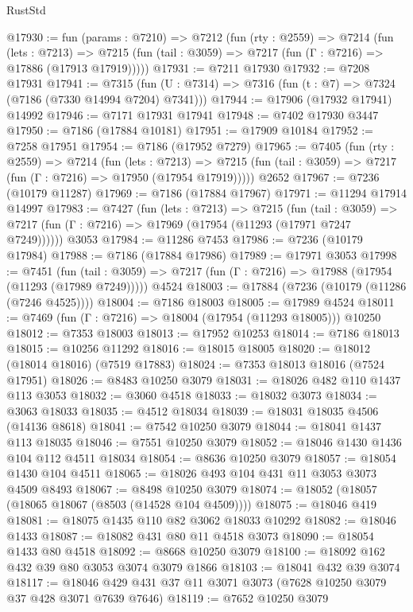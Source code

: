 \begin{lexlean}{RustStd}
\begin{coremodule}
{\begin{coremodule}
{{{{{{{{{{{{{{{{{{{{{{{{{{{{{{{{@17930 := fun (params : @7210) =>
  @7212
    (fun (rty : @2559) =>
    @7214
      (fun (lets : @7213) =>
      @7215 (fun (tail : @3059) => @7217 (fun (Γ : @7216) => @17886 (@17913 @17919)))))
@17931 := @7211 @17930
@17932 := @7208 @17931
@17941 := @7315
    (fun (U : @7314) => @7316 (fun (t : @7) => @7324 (@7186 (@7330 @14994 @7204) @7341)))
@17944 := @17906 (@17932 @17941) @14992
@17946 := @7171 @17931 @17941
@17948 := @7402 @17930 @3447
@17950 := @7186 (@17884 @10181)
@17951 := @17909 @10184
@17952 := @7258 @17951
@17954 := @7186 (@17952 @7279)
@17965 := @7405
    (fun (rty : @2559) =>
    @7214
      (fun (lets : @7213) =>
      @7215 (fun (tail : @3059) => @7217 (fun (Γ : @7216) => @17950 (@17954 @17919)))))
    @2652
@17967 := @7236 (@10179 @11287)
@17969 := @7186 (@17884 @17967)
@17971 := @11294 @17914 @14997
@17983 := @7427
    (fun (lets : @7213) =>
    @7215
      (fun (tail : @3059) =>
      @7217 (fun (Γ : @7216) => @17969 (@17954 (@11293 (@17971 @7247 @7249))))))
    @3053
@17984 := @11286 @7453
@17986 := @7236 (@10179 @17984)
@17988 := @7186 (@17884 @17986)
@17989 := @17971 @3053
@17998 := @7451
    (fun (tail : @3059) => @7217 (fun (Γ : @7216) => @17988 (@17954 (@11293 (@17989 @7249)))))
    @4524
@18003 := @17884 (@7236 (@10179 (@11286 (@7246 @4525))))
@18004 := @7186 @18003
@18005 := @17989 @4524
@18011 := @7469 (fun (Γ : @7216) => @18004 (@17954 (@11293 @18005))) @10250
@18012 := @7353 @18003
@18013 := @17952 @10253
@18014 := @7186 @18013
@18015 := @10256 @11292
@18016 := @18015 @18005
@18020 := @18012 (@18014 @18016) (@7519 @17883)
@18024 := @7353 @18013 @18016 (@7524 @17951)
@18026 := @8483 @10250 @3079
@18031 := @18026 @482 @110 @1437 @113 @3053
@18032 := @3060 @4518
@18033 := @18032 @3073
@18034 := @3063 @18033
@18035 := @4512 @18034
@18039 := @18031 @18035 @4506 (@14136 @8618)
@18041 := @7542 @10250 @3079
@18044 := @18041 @1437 @113 @18035
@18046 := @7551 @10250 @3079
@18052 := @18046 @1430 @1436 @104 @112 @4511 @18034
@18054 := @8636 @10250 @3079
@18057 := @18054 @1430 @104 @4511
@18065 := @18026 @493 @104 @431 @11 @3053 @3073 @4509 @8493
@18067 := @8498 @10250 @3079
@18074 := @18052 (@18057 (@18065 @18067 (@8503 (@14528 @104 @4509))))
@18075 := @18046 @419
@18081 := @18075 @1435 @110 @82 @3062 @18033 @10292
@18082 := @18046 @1433
@18087 := @18082 @431 @80 @11 @4518 @3073
@18090 := @18054 @1433 @80 @4518
@18092 := @8668 @10250 @3079
@18100 := @18092 @162 @432 @39 @80 @3053 @3074 @3079 @1866
@18103 := @18041 @432 @39 @3074
@18117 := @18046 @429 @431 @37 @11 @3071 @3073 (@7628 @10250 @3079 @37 @428 @3071 @7639 @7646)
@18119 := @7652 @10250 @3079
}}}}}}}}}}}}}}}}}}}}}}}}}}}}}}}}
\end{coremodule}}
\end{coremodule}
\end{lexlean}
